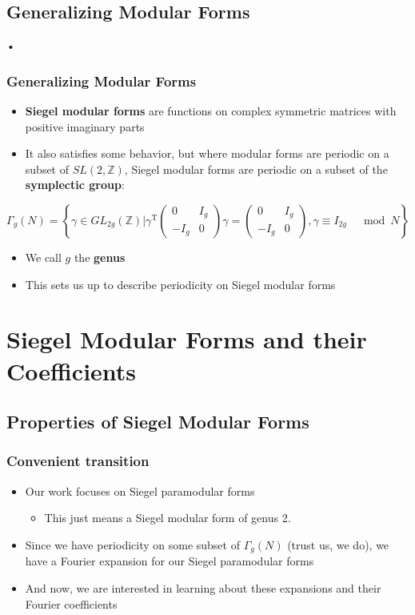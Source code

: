 \documentclass[11pt]{beamer}
\begin{document}
\subsection{Generalizing Modular Forms}
\begin{frame}{•}
\frametitle{Generalizing Modular Forms}
\begin{itemize}
\item \textbf{Siegel modular forms} are functions on complex symmetric matrices with positive imaginary parts
\item It also satisfies some behavior, but where modular forms are periodic on a subset of $SL(2, \mathbb{Z})$, Siegel modular forms are periodic on a subset of the \textbf{symplectic group}:
\end{itemize}
$\Gamma_{g}(N)=\left\{\gamma \in G L_{2 g}(\mathbb{Z}) | \gamma^{\mathrm{T}} \left( \begin{array}{cc}{0} & {I_{g}} \\ {-I_{g}} & {0}\end{array}\right) \gamma=\left( \begin{array}{cc}{0} & {I_{g}} \\ {-I_{g}} & {0}\end{array}\right), \gamma \equiv I_{2 g} \quad \bmod N\right\}$
\begin{itemize}
\item We call $g$ the \textbf{genus}
\item This sets us up to describe periodicity on Siegel modular forms
\end{itemize}
\end{frame}

\section{Siegel Modular Forms and their Coefficients}
\subsection{Properties of Siegel Modular Forms}
\begin{frame}
\frametitle{Convenient transition}
\begin{itemize}
\item Our work focuses on Siegel paramodular forms
\begin{itemize}
\item This just means a Siegel modular form of genus 2.
\end{itemize}
\item Since we have periodicity on some subset of $\Gamma_{g}(N)$ (trust us, we do), we have a Fourier expansion for our Siegel paramodular forms
\item And now, we are interested in learning about these expansions and their Fourier coefficients
\end{itemize}
\end{frame}
\end{document}
